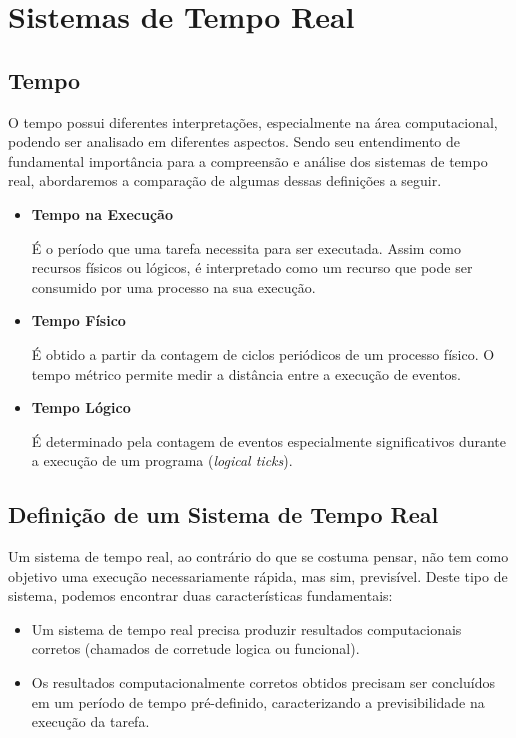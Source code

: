\section{Sistemas de Tempo Real}
\label{sec:STR}

\subsection{Tempo}
O tempo possui diferentes interpretações, especialmente na área computacional,
podendo ser analisado em diferentes aspectos. Sendo seu entendimento de
fundamental importância para a compreensão e análise dos sistemas de tempo
real, abordaremos a comparação de algumas dessas definições a seguir.~\cite{Motus199321}

\begin{itemize}
\item \textbf{Tempo na Execução}

É o período que uma tarefa necessita para ser executada. Assim como recursos
físicos ou lógicos, é interpretado como um recurso que pode ser consumido
por uma processo na sua execução.

\item \textbf{Tempo Físico}

É obtido a partir da contagem de ciclos periódicos de um processo físico.
O tempo métrico permite medir a distância entre a execução de eventos.

\item \textbf{Tempo Lógico}

É determinado pela contagem de eventos especialmente significativos durante a execução de
um programa (\textit{logical ticks}).

\end{itemize}

\subsection{Definição de um Sistema de Tempo Real}
Um sistema de tempo real, ao contrário do que se costuma pensar, não tem
como objetivo uma execução necessariamente rápida, mas sim, previsível.
Deste tipo de sistema, podemos encontrar duas características fundamentais:

\begin{itemize}
\item Um sistema de tempo real precisa produzir resultados computacionais corretos
(chamados de corretude logica ou funcional).
\item Os resultados computacionalmente corretos obtidos precisam ser concluídos em
um período de tempo pré-definido, caracterizando a previsibilidade na execução da tarefa.
\end{itemize}


